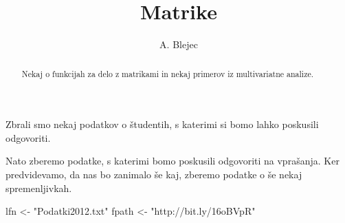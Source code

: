 \usepackage[slovene]{babel}
\usepackage[utf8]{inputenc} %
\newcommand{\SVNRevision}{$ $Rev: 3 $ $}
\newcommand{\SVNId}{$ $Id: program.Rnw 3 2009-02-22 17:36:08Z ABlejec $ $}
%
%


%
\usepackage{pgf,pgfarrows,pgfnodes,pgfautomata,pgfheaps,pgfshade}
\usepackage{amsmath,amssymb}
\usepackage{colortbl}
\usepackage{Sweave}

\newcommand{\BV}{}
\newcommand{\EV}{}
\newcommand{\myemph}[1]{{\color{Sgreen} \textit{#1}}}

%

\title{Matrike}
\author{A. Blejec}
%


 {\maketitle}
 {\frame{\titlepage}}
\tableofcontents
\begin{abstract}
 Nekaj o funkcijah za delo z matrikami in nekaj primerov iz multivariatne analize.
\end{abstract}


Zbrali smo nekaj podatkov o študentih, s katerimi si bomo lahko poskusili odgovoriti.

Nato zberemo podatke, s katerimi bomo poskusili odgovoriti na vprašanja. Ker predvidevamo, da nas bo zanimalo še kaj, zberemo podatke o še nekaj spremenljivkah.
\begin{Schunk}
\begin{Sinput}
 lfn <- "Podatki2012.txt"
 fpath <- "http://bit.ly/16oBVpR"
\end{Sinput}
\end{Schunk}

